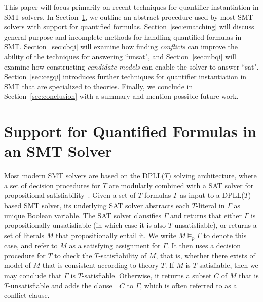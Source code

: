 \documentclass[oribibl]{llncs}
\begin{document}
This paper will focus primarily on recent techniques for quantifier instantiation in SMT solvers.
In Section~\ref{sec:quant}, we outline an abstract procedure used by most SMT solvers with support for quantified formulas.
Section~\ref{sec:ematching} will discuss general-purpose and incomplete methods for handling quantified formulas in SMT.
Section~\ref{sec:cbqi} will examine how finding \emph{conflicts} can improve the ability of the techniques for answering ``unsat",
and Section~\ref{sec:mbqi} will examine how constructing \emph{candidate models} can enable the solver to answer ``sat".
Section~\ref{sec:cegqi} introduces further techniques for quantifier instantiation in SMT that 
are specialized to theories.
Finally, we conclude in Section~\ref{sec:conclusion} with a summary and mention possible future work.

\section{Support for Quantified Formulas in an SMT Solver}
\label{sec:quant}

Most modern SMT solvers are based on the DPLL($T$) solving architecture,
where a set of decision procedures for $T$ are modularly combined with a SAT solver for propositional satisfiability~\cite{}.
Given a set of $T$-formulas $\Gamma$ as input to a DPLL($T$)-based SMT solver, its underlying SAT solver
abstracts each $T$-literal in $\Gamma$ as unique Boolean variable.
The SAT solver clausifies $\Gamma$ and returns that 
either $\Gamma$ is propositionally unsatisfiable (in which case it is also $T$-unsatisfiable),
or returns a set of literals $M$ that propositionally entail it.
We write $M \models_p \Gamma$ to denote this case, and refer to $M$ as a satisfying assignment for $\Gamma$.
It then uses a decision procedure for $T$ to
check the $T$-satisfiability of $M$, that is, whether there exists of model of $M$ that is consistent according to theory $T$.
If $M$ is $T$-satisfiable, then we may conclude that $\Gamma$ is $T$-satisfiable.
Otherwise, it returns a subset $C$ of $M$ that is $T$-unsatisfiable and adds the clause $\neg C$ to $\Gamma$,
which is often referred to as a conflict clause.

\end{document}
